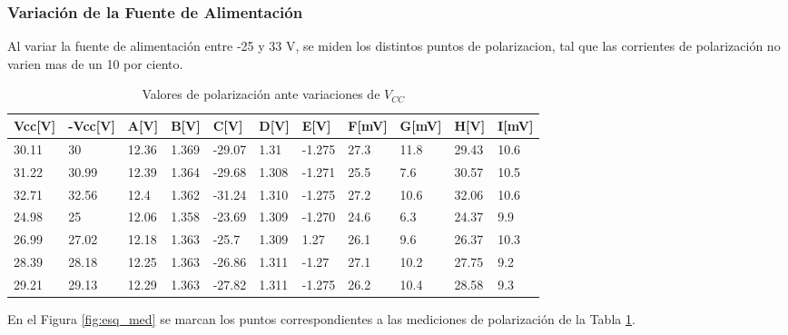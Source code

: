 		
		\subsubsection{Variación de la Fuente de Alimentación}
		Al variar la fuente de alimentación entre -25 y 33 V, se miden los distintos puntos de polarizacion, tal que las corrientes de polarización no varien mas de un 10 por ciento.
		\begin{table}[]
			\centering
		\begin{tabular}{|l|l|l|l|l|l|l|l|l|l|l|}
		\hline
		Vcc{[}V{]} & -Vcc{[}V{]} & A{[}V{]} & B{[}V{]} & C{[}V{]} & D{[}V{]} & E{[}V{]} & F{[}mV{]} & G{[}mV{]} & H{[}V{]} & I{[}mV{]} \\ \hline
		30.11      & 30          & 12.36    & 1.369    & -29.07   & 1.31     & -1.275   & 27.3      & 11.8      & 29.43    & 10.6      \\ \hline
		31.22      & 30.99       & 12.39    & 1.364    & -29.68   & 1.308    & -1.271   & 25.5      & 7.6       & 30.57    & 10.5      \\ \hline
		32.71      & 32.56       & 12.4     & 1.362    & -31.24   & 1.310    & -1.275   & 27.2      & 10.6      & 32.06    & 10.6      \\ \hline
		24.98      & 25          & 12.06    & 1.358    & -23.69   & 1.309    & -1.270   & 24.6      & 6.3       & 24.37    & 9.9       \\ \hline
		26.99      & 27.02       & 12.18    & 1.363    & -25.7    & 1.309    & 1.27     & 26.1      & 9.6       & 26.37    & 10.3      \\ \hline
		28.39      & 28.18       & 12.25    & 1.363    & -26.86   & 1.311    & -1.27    & 27.1      & 10.2      & 27.75    & 9.2       \\ \hline
		29.21      & 29.13       & 12.29    & 1.363    & -27.82   & 1.311    & -1.275   & 26.2      & 10.4      & 28.58    & 9.3       \\ \hline
		\end{tabular}
		\caption{Valores de polarización ante variaciones de $V_{CC}$}
		\label{tab.valores}
		\end{table}



		En el Figura \ref{fig:esq_med} se marcan los puntos correspondientes a las mediciones de polarización de la Tabla \ref{tab.valores}.

